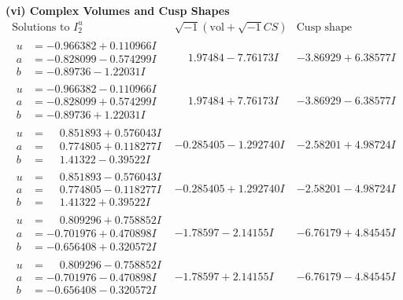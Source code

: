 \documentclass[1p]{elsarticle_modified}
\theoremstyle{definition}
\newcommand{\I}{\sqrt{-1}}
\begin{document}
\newpage\flushleft \textbf{(vi) Complex Volumes and Cusp Shapes}
$$\begin{array}{c|c|c}  
\text{Solutions to }I^u_{2}& \I (\text{vol} + \sqrt{-1}CS) & \text{Cusp shape}\\
 \hline 
\begin{aligned}
u &= -0.966382 + 0.110966 I \\
a &= -0.828099 - 0.574299 I \\
b &= -0.89736 - 1.22031 I\end{aligned}
 & \phantom{-}1.97484 - 7.76173 I & -3.86929 + 6.38577 I \\ \hline\begin{aligned}
u &= -0.966382 - 0.110966 I \\
a &= -0.828099 + 0.574299 I \\
b &= -0.89736 + 1.22031 I\end{aligned}
 & \phantom{-}1.97484 + 7.76173 I & -3.86929 - 6.38577 I \\ \hline\begin{aligned}
u &= \phantom{-}0.851893 + 0.576043 I \\
a &= \phantom{-}0.774805 + 0.118277 I \\
b &= \phantom{-}1.41322 - 0.39522 I\end{aligned}
 & -0.285405 - 1.292740 I & -2.58201 + 4.98724 I \\ \hline\begin{aligned}
u &= \phantom{-}0.851893 - 0.576043 I \\
a &= \phantom{-}0.774805 - 0.118277 I \\
b &= \phantom{-}1.41322 + 0.39522 I\end{aligned}
 & -0.285405 + 1.292740 I & -2.58201 - 4.98724 I \\ \hline\begin{aligned}
u &= \phantom{-}0.809296 + 0.758852 I \\
a &= -0.701976 + 0.470898 I \\
b &= -0.656408 + 0.320572 I\end{aligned}
 & -1.78597 - 2.14155 I & -6.76179 + 4.84545 I \\ \hline\begin{aligned}
u &= \phantom{-}0.809296 - 0.758852 I \\
a &= -0.701976 - 0.470898 I \\
b &= -0.656408 - 0.320572 I\end{aligned}
 & -1.78597 + 2.14155 I & -6.76179 - 4.84545 I \\ \hline\begin{aligned}

\end{aligned}
\end{array}$$
\end{document}
